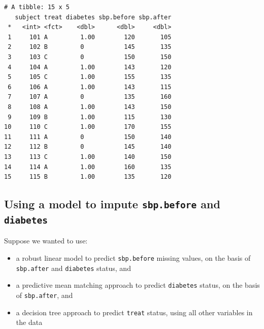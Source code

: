\documentclass[]{book}
\newenvironment{Shaded}{\begin{snugshade}}{\end{snugshade}}
\newcommand{\KeywordTok}[1]{\textcolor[rgb]{0.13,0.29,0.53}{\textbf{#1}}}
\newcommand{\DecValTok}[1]{\textcolor[rgb]{0.00,0.00,0.81}{#1}}
\newcommand{\StringTok}[1]{\textcolor[rgb]{0.31,0.60,0.02}{#1}}
\newcommand{\OperatorTok}[1]{\textcolor[rgb]{0.81,0.36,0.00}{\textbf{#1}}}
\newcommand{\NormalTok}[1]{#1}
\providecommand{\tightlist}{%
  \setlength{\itemsep}{0pt}\setlength{\parskip}{0pt}}
\theoremstyle{definition}
\theoremstyle{definition}
\theoremstyle{definition}
\theoremstyle{remark}
\begin{document}
\begin{verbatim}
# A tibble: 15 x 5
   subject treat diabetes sbp.before sbp.after
 *   <int> <fct>    <dbl>      <dbl>     <dbl>
 1     101 A         1.00        120       105
 2     102 B         0           145       135
 3     103 C         0           150       150
 4     104 A         1.00        143       120
 5     105 C         1.00        155       135
 6     106 A         1.00        143       115
 7     107 A         0           135       160
 8     108 A         1.00        143       150
 9     109 B         1.00        115       130
10     110 C         1.00        170       155
11     111 A         0           150       140
12     112 B         0           145       140
13     113 C         1.00        140       150
14     114 A         1.00        160       135
15     115 B         1.00        135       120
\end{verbatim}

\subsection{\texorpdfstring{Using a model to impute \texttt{sbp.before}
and
\texttt{diabetes}}{Using a model to impute sbp.before and diabetes}}\label{using-a-model-to-impute-sbp.before-and-diabetes}

Suppose we wanted to use:

\begin{itemize}
\tightlist
\item
  a robust linear model to predict \texttt{sbp.before} missing values,
  on the basis of \texttt{sbp.after} and \texttt{diabetes} status, and
\item
  a predictive mean matching approach to predict \texttt{diabetes}
  status, on the basis of \texttt{sbp.after}, and
\item
  a decision tree approach to predict \texttt{treat} status, using all
  other variables in the data
\end{itemize}

\begin{Shaded}
\end{Shaded}
\end{document}

